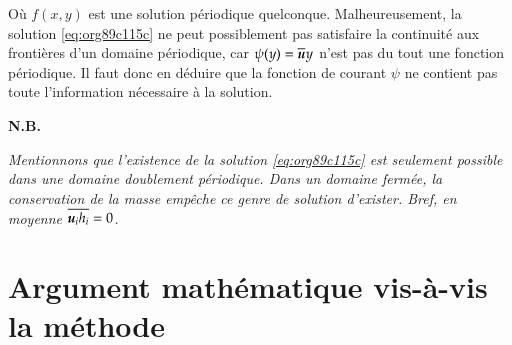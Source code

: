 \documentclass[10pt]{article}
\numberwithin{equation}{section}
\newcommand{\uu}{\vb*{u}}
\begin{document}
Où \(f(x,y)\) est une solution périodique quelconque. 
Malheureusement, la solution \ref{eq:org89c115c} ne peut possiblement pas satisfaire la continuité aux frontières d'un domaine périodique, car \(\psi(y) = \overline{\uu} y\) n'est pas du tout une fonction périodique.
Il faut donc en déduire que la fonction de courant \(\psi\) ne contient pas toute l'information nécessaire à la solution.\bigskip

\textbf{N.B.\ } \begin{minipage}[t]{0.94\linewidth}
   \itshape Mentionnons que l'existence de la solution \ref{eq:org89c115c} est seulement possible dans une domaine doublement périodique.
   Dans un domaine fermée, la conservation de la masse empêche ce genre de solution d'exister. Bref, en moyenne \(\overline{\uu_i h_i} = 0\).
\end{minipage}


\section{Argument mathématique vis-à-vis la méthode}
\label{sec:org1085554}
\end{document}
